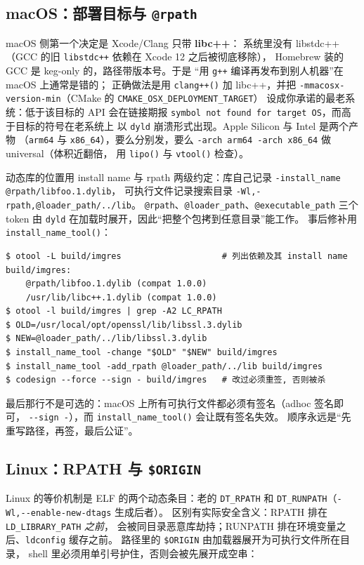 \documentclass[12pt,a4paper,fontset=fandol]{ctexbook}
\newcommand{\Fn}[1]{\texttt{#1()}}
\newcommand{\Tp}[1]{\texttt{#1}}
\newcommand{\Bk}{\allowbreak}
\begin{document}
\subsection{macOS：部署目标与 \Tp{@rpath}}

macOS 侧第一个决定是 Xcode/Clang 只带 \textbf{libc++}：
系统里没有 libstdc++（GCC 的旧 \Tp{libstdc++} 依赖在 Xcode 12 之后被彻底移除），
Homebrew 装的 GCC 是 keg-only 的，路径带版本号。于是
``用 \Tp{g++} 编译再发布到别人机器''在 macOS 上通常是错的；
正确做法是用 \Fn{clang++} 加 libc++，并把
\Tp{-mmacosx-version-min}（CMake 的 \Tp{CMAKE\Bk\_OSX\Bk\_DEPLOYMENT\Bk\_TARGET}）
设成你承诺的最老系统：低于该目标的 API 会在链接期报
\lstinline|symbol not found for target OS|，而高于目标的符号在老系统上
以 \Tp{dyld} 崩溃形式出现。Apple Silicon 与 Intel 是两个产物
（\Tp{arm64} 与 \Tp{x86\_64}），要么分别发，要么
\lstinline|-arch arm64 -arch x86_64| 做 universal（体积近翻倍，
用 \Fn{lipo} 与 \Fn{vtool} 检查）。

动态库的位置用 install name 与 rpath 两级约定：库自己记录
\lstinline|-install_name @rpath/libfoo.1.dylib|，
可执行文件记录搜索目录 \lstinline|-Wl,-rpath,@loader_path/../lib|。
\Tp{@rpath}、\Tp{@loader\_{\Bk}path}、\Tp{@executable\_{\Bk}path}
三个token 由 \Tp{dyld} 在加载时展开，因此``把整个包拷到任意目录''能工作。
事后修补用 \Fn{install\_{\Bk}name\_{\Bk}tool}：

\begin{lstlisting}[style=shellstyle,caption={查看与改写 Mach-O 的依赖路径}]
$ otool -L build/imgres                    # 列出依赖及其 install name
build/imgres:
    @rpath/libfoo.1.dylib (compat 1.0.0)
    /usr/lib/libc++.1.dylib (compat 1.0.0)
$ otool -l build/imgres | grep -A2 LC_RPATH
$ OLD=/usr/local/opt/openssl/lib/libssl.3.dylib
$ NEW=@loader_path/../lib/libssl.3.dylib
$ install_name_tool -change "$OLD" "$NEW" build/imgres
$ install_name_tool -add_rpath @loader_path/../lib build/imgres
$ codesign --force --sign - build/imgres   # 改过必须重签, 否则被杀
\end{lstlisting}

最后那行不是可选的：macOS 上所有可执行文件都必须有签名（adhoc 签名即可，
\lstinline|--sign -|），而 \Fn{install\_name\_tool} 会让既有签名失效。
顺序永远是``先重写路径，再签，最后公证''。

\subsection{Linux：RPATH 与 \Tp{\$ORIGIN}}

Linux 的等价机制是 ELF 的两个动态条目：老的 \Tp{DT\_RPATH} 和
\Tp{DT\_RUNPATH}（\lstinline|-Wl,--enable-new-dtags| 生成后者）。
区别有实际安全含义：RPATH 排在 \Tp{LD\_LIBRARY\_PATH} \emph{之前}，
会被同目录恶意库劫持；RUNPATH 排在环境变量之后、\Tp{ldconfig} 缓存之前。
路径里的 \Tp{\$ORIGIN} 由加载器展开为可执行文件所在目录，
shell 里必须用单引号护住，否则会被先展开成空串：
\end{document}
